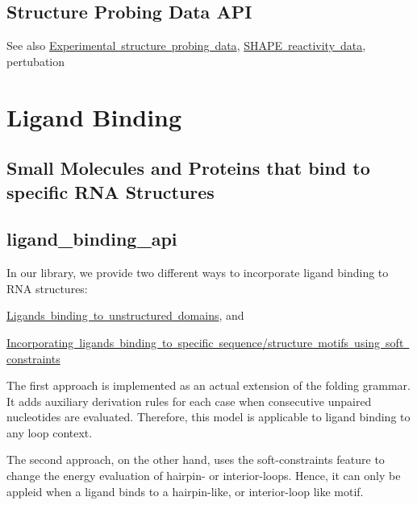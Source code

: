 \hypertarget{structure_probing_data_structure_probing_api}{}\subsection{Structure Probing Data A\+PI}\label{structure_probing_data_structure_probing_api}
\begin{DoxySeeAlso}{See also}
\mbox{\hyperlink{group__probing__data}{Experimental structure probing data}}, \mbox{\hyperlink{group___s_h_a_p_e__reactivities}{S\+H\+A\+PE reactivity data}}, pertubation
\end{DoxySeeAlso}
 \hypertarget{ligand_binding}{}\section{Ligand Binding}\label{ligand_binding}
\hypertarget{ligand_binding_ligand_binding_intro}{}\subsection{Small Molecules and Proteins that bind to specific R\+N\+A Structures}\label{ligand_binding_ligand_binding_intro}
\hypertarget{ligand_binding_ligand_binding_api}{}\subsection{ligand\+\_\+binding\+\_\+api}\label{ligand_binding_ligand_binding_api}
In our library, we provide two different ways to incorporate ligand binding to R\+NA structures\+:


\begin{DoxyItemize}
\item \mbox{\hyperlink{group__ligands__up}{Ligands binding to unstructured domains}}, and
\item \mbox{\hyperlink{group__constraints__ligand}{Incorporating ligands binding to specific sequence/structure motifs using soft constraints}}
\end{DoxyItemize}

The first approach is implemented as an actual extension of the folding grammar. It adds auxiliary derivation rules for each case when consecutive unpaired nucleotides are evaluated. Therefore, this model is applicable to ligand binding to any loop context.

The second approach, on the other hand, uses the soft-\/constraints feature to change the energy evaluation of hairpin-\/ or interior-\/loops. Hence, it can only be appleid when a ligand binds to a hairpin-\/like, or interior-\/loop like motif.

